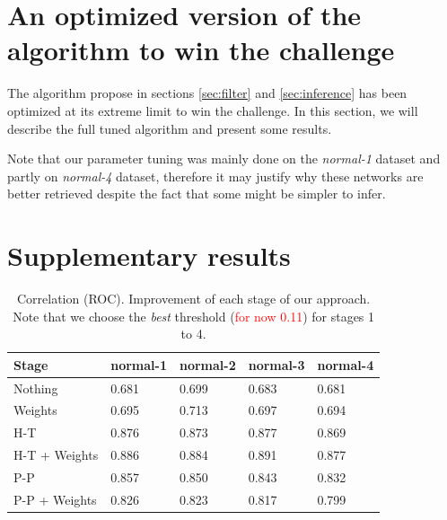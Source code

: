 \documentclass[wcp]{jmlr}
\begin{document}
\newpage
\clearpage



\newpage
\clearpage

\appendix


\section{An optimized version of the algorithm to win the challenge}
\label{app:optimized}


The algorithm propose in sections \ref{sec:filter} and \ref{sec:inference} has been optimized at its extreme limit to win the challenge. In this section, we will describe the full tuned algorithm and present some results.

Note that our parameter tuning was mainly
done on the \textit{normal-1} dataset and partly on \textit{normal-4} dataset,
therefore it may justify why these networks are better retrieved despite the
fact that some might be simpler to infer.



\section{Supplementary results}

\begin{table}[htbp]
\centering
\caption{Correlation (ROC). Improvement of each stage of our approach. Note that we choose the
         \textit{best} threshold (\textcolor{red}{for now 0.11}) for stages 1 to 4.}
\begin{tabular}{*{5}{l}}
\toprule
Stage               & normal-1 & normal-2 & normal-3 & normal-4 \\
\midrule
Nothing             & 0.681 & 0.699 & 0.683 & 0.681\\
Weights             & 0.695 & 0.713 & 0.697 & 0.694\\
H-T                 & 0.876 & 0.873 & 0.877 & 0.869\\
H-T + Weights       & 0.886 & 0.884 & 0.891 & 0.877\\
P-P                 & 0.857 & 0.850 & 0.843 & 0.832\\
P-P + Weights       & 0.826 & 0.823 & 0.817 & 0.799\\
\bottomrule
\end{tabular}
\end{table}
\end{document}
